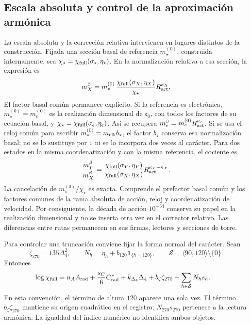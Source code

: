 \subsection{Escala absoluta y control de la aproximación armónica}
\label{subsec:vi-precision-torres}

La escala absoluta y la corrección relativa intervienen en lugares
distintos de la construcción. Fijada una sección basal de referencia
\(m_\star^{(0)}\), construida internamente, sea
\(\chi_\star=\chi_{\rm full}(\sigma_\star,\eta_\star)\).
En la normalización relativa a esa sección, la expresión es
\[
 m_X^\beta=m_\star^{(0)}\,
 \frac{\chi_{\rm full}(\sigma_X,\eta_X)}{\chi_\star}
 R_{\rm act}^{\kappa_X}.
\]
El factor basal común permanece explícito. Si la referencia es electrónica,
\(m_\star^{(0)}=m_e^{(0)}\) es la realización dimensional de
\(\mathfrak e_0\), con todos los factores de su ecuación basal, y
\(\chi_\star=\chi_{\rm full}(\sigma_e,\eta_e)\). Así se recupera
\(m_e^\beta=m_e^{(0)}R_{\rm act}^{\kappa_e}\). Si se usa el reloj
común para escribir \(m_\star^{(0)}=m_{\rm clk}b_\star\), el
factor \(b_\star\) conserva esa normalización basal; no se lo sustituye
por \(1\) ni se lo incorpora dos veces al carácter. Para dos estados
en la misma coordenatización y con la misma referencia, el cociente es
\[
 \frac{m_Y^\beta}{m_X^\beta}
 =\frac{\chi_{\rm full}(\sigma_Y,\eta_Y)}
        {\chi_{\rm full}(\sigma_X,\eta_X)}
     R_{\rm act}^{\kappa_Y-\kappa_X}.
\]
La cancelación de \(m_\star^{(0)}/\chi_\star\) es exacta. Comprende
el prefactor basal común y los factores comunes de la rama absoluta de
acción, reloj y coordenatización de velocidad. Por
consiguiente, la década de acción \(10^{-34}\) conserva su papel en
la realización dimensional y no se inserta otra vez en el corrector
relativo. Las diferencias entre rutas permanecen en sus firmas, lectores
y secciones de torre.

Para controlar una truncación conviene fijar la forma normal del carácter.
Sean
\[
 \zeta_{270}=135\Delta_4^2,\qquad
 N_h=\eta_h+b_{120}\mathbf 1_{\{h=120\}},\qquad
 \mathcal S=\langle90,120\rangle\setminus\{0\}.
\]
Entonces
\[
\begin{split}
 \log\chi_{\rm full}
 ={}&n_AA_{\rm rad}+\frac{s_C}{6}C^*_{\rm rad}
       +k_{\Delta_4}\Delta_4+b_\zeta\zeta_{270}
       +\sum_{h\in\mathcal S}N_hs_h .
\end{split}
\]
En esta convención, el término de altura \(120\) aparece una sola vez.
El término \(b_\zeta\zeta_{270}\) mantiene su origen cuadrático en el
registro; \(N_{270}s_{270}\) pertenece a la lectura armónica. La
igualdad del índice numérico no identifica ambos objetos.

